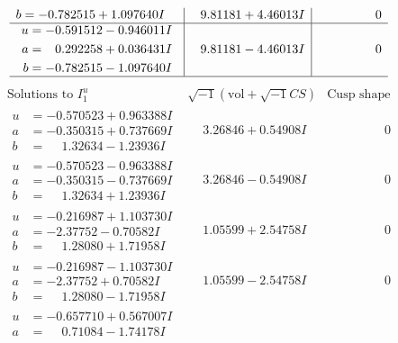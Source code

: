\documentclass[1p]{elsarticle_modified}
\theoremstyle{definition}
\newcommand{\I}{\sqrt{-1}}
\begin{document}
$$\begin{array}{c|c|c}
\begin{aligned}
b &= -0.782515 + 1.097640 I\end{aligned}
 & \phantom{-}9.81181 + 4.46013 I & \phantom{-0.000000 } 0 \\ \hline\begin{aligned}
u &= -0.591512 - 0.946011 I \\
a &= \phantom{-}0.292258 + 0.036431 I \\
b &= -0.782515 - 1.097640 I\end{aligned}
 & \phantom{-}9.81181 - 4.46013 I & \phantom{-0.000000 } 0\\
 \hline 
 \end{array}$$\newpage$$\begin{array}{c|c|c}  
\text{Solutions to }I^u_{1}& \I (\text{vol} + \sqrt{-1}CS) & \text{Cusp shape}\\
 \hline 
\begin{aligned}
u &= -0.570523 + 0.963388 I \\
a &= -0.350315 + 0.737669 I \\
b &= \phantom{-}1.32634 - 1.23936 I\end{aligned}
 & \phantom{-}3.26846 + 0.54908 I & \phantom{-0.000000 } 0 \\ \hline\begin{aligned}
u &= -0.570523 - 0.963388 I \\
a &= -0.350315 - 0.737669 I \\
b &= \phantom{-}1.32634 + 1.23936 I\end{aligned}
 & \phantom{-}3.26846 - 0.54908 I & \phantom{-0.000000 } 0 \\ \hline\begin{aligned}
u &= -0.216987 + 1.103730 I \\
a &= -2.37752 - 0.70582 I \\
b &= \phantom{-}1.28080 + 1.71958 I\end{aligned}
 & \phantom{-}1.05599 + 2.54758 I & \phantom{-0.000000 } 0 \\ \hline\begin{aligned}
u &= -0.216987 - 1.103730 I \\
a &= -2.37752 + 0.70582 I \\
b &= \phantom{-}1.28080 - 1.71958 I\end{aligned}
 & \phantom{-}1.05599 - 2.54758 I & \phantom{-0.000000 } 0 \\ \hline\begin{aligned}
u &= -0.657710 + 0.567007 I \\
a &= \phantom{-}0.71084 - 1.74178 I \\

\end{aligned}
\end{array}$$
\end{document}
